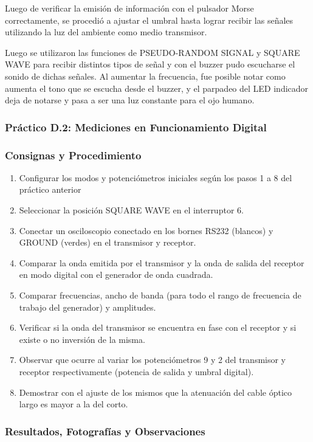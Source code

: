 Luego de verificar la emisión de información con el pulsador Morse correctamente, se procedió a ajustar el umbral hasta lograr recibir las señales utilizando la luz del ambiente como medio transmisor.

Luego se utilizaron las funciones de PSEUDO-RANDOM SIGNAL y SQUARE WAVE para recibir distintos tipos de señal y con el buzzer pudo escucharse el sonido de dichas señales. Al aumentar la frecuencia, fue posible notar como aumenta el tono que se escucha desde el buzzer, y el parpadeo del LED indicador deja de notarse y pasa a ser una luz constante para el ojo humano.


\subsubsection{Práctico D.2: Mediciones en Funcionamiento Digital}

\subsubsection*{Consignas y Procedimiento}
\begin{enumerate}
    \item Configurar los modos y potenciómetros iniciales según los pasos 1 a 8 del práctico anterior
    \item Seleccionar la posición SQUARE WAVE en el interruptor 6.
    \item Conectar un osciloscopio conectado en los bornes RS232 (blancos) y GROUND (verdes) en el transmisor y receptor. 
    \item Comparar la onda emitida por el transmisor y la onda de salida del receptor en modo digital con el generador de onda cuadrada.
    \item Comparar frecuencias, ancho de banda (para todo el rango de frecuencia de trabajo del generador) y amplitudes. 
    \item Verificar si la onda del transmisor se encuentra en fase con el receptor y si existe o no inversión de la misma. 
    \item Observar que ocurre al variar los potenciómetros 9 y 2 del transmisor y receptor respectivamente (potencia de salida y umbral digital).
    \item Demostrar con el ajuste de los mismos que la atenuación del cable óptico largo es mayor a la del corto.
\end{enumerate}

\subsubsection*{Resultados, Fotografías y Observaciones}

